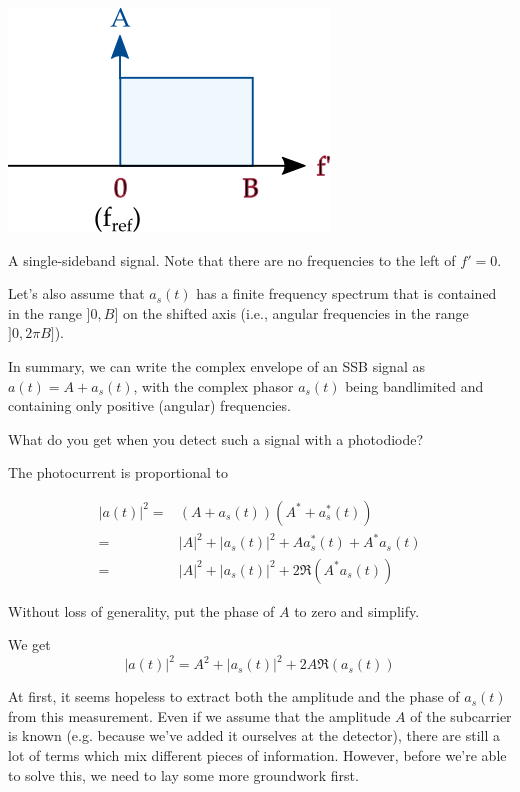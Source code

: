 \begin{marginfigure}[-2.0cm]
    \includegraphics{kk/figures/SSB}
    \caption{A single-sideband signal. Note that there are no frequencies to the left of $f'=0$.}
    \label{fig-ssb}
\end{marginfigure}

Let's also assume that $a_s(t)$ has a finite frequency spectrum that is contained in the range $]0, B]$ on the shifted axis (i.e., angular frequencies in the range $]0, 2\pi B]$). 

In summary, we can write the complex envelope of an SSB signal as $a(t) = A + a_s(t)$, with the complex phasor $a_s(t)$ being bandlimited and containing only positive (angular) frequencies.

\begin{cue}
What do you get when you detect such a signal with a photodiode?
\end{cue}

The photocurrent is proportional to

\begin{align}
\left| a(t) \right| ^2 =&  \left(A + a_s(t) \right) \left(A^* + a_s^*(t) \right) \nonumber \\
 =& |A|^2 + \left| a_s(t) \right|^2 + Aa_s^*(t) + A^*a_s(t)  \nonumber \\
 =& |A|^2 + \left| a_s(t) \right|^2 + 2 \Re \left(A^* a_s(t) \right)
\end{align}

\begin{cue}
Without loss of generality, put the phase of $A$ to zero and simplify.
\end{cue}

We get 
\begin{equation}
\left| a(t) \right| ^2 = A^2 + \left| a_s(t) \right|^2 + 2 A \Re \left(a_s(t) \right)
\label{eq-kk-heterodyne}
\end{equation}

At first, it seems hopeless to extract both the amplitude and the phase of $a_s(t)$ from this measurement. Even if we assume that the amplitude $A$ of the subcarrier is known (e.g. because we've added it ourselves at the detector), there are still a lot of terms which mix different pieces of information. However, before we're able to solve this, we need to lay some more groundwork first.

